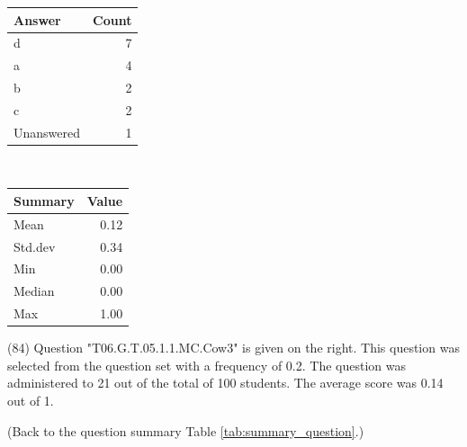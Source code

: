 \documentclass[12pt,nohyper]{tufte-handout}\usepackage[]{graphicx}\usepackage[]{color}
\begin{document}
\begin{center}%
\begin{tabular}{lr}
  \hline
Answer & Count \\ 
  \hline
d &   7 \\ 
  a &   4 \\ 
  b &   2 \\ 
  c &   2 \\ 
  Unanswered &   1 \\ 
   \hline
\end{tabular}
~~~~~~~~%
\begin{tabular}{lr}
  \hline
Summary & Value \\ 
  \hline
Mean & 0.12 \\ 
  Std.dev & 0.34 \\ 
  Min & 0.00 \\ 
  Median & 0.00 \\ 
  Max & 1.00 \\ 
   \hline
\end{tabular}
\end{center}\newpage{} (84) Question "T06.G.T.05.1.1.MC.Cow3" is given on the right. This question was selected from the question set with a frequency of 0.2. The question was administered to 21 out of the total of 100 students. The average score was 0.14 out of 1.

 (Back to the question summary Table \ref{tab:summary_question}.)
\end{document}
